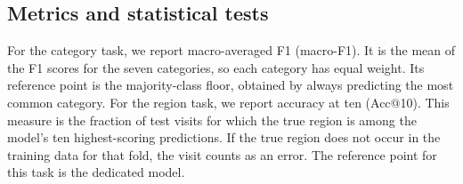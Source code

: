 %
%
%

\subsection{Metrics and statistical tests}
\label{sec:mobiwac:setup-metrics}
For the category task, we report macro-averaged F1 (macro-F1). It is the mean of the F1 scores for the seven categories, so each category has equal weight. Its reference point is the majority-class floor, obtained by always predicting the most common category. For the region task, we report accuracy at ten (Acc@10). This measure is the fraction of test visits for which the true region is among the model's ten highest-scoring predictions. If the true region does not occur in the training data for that fold, the visit counts as an error. The reference point for this task is the dedicated model.

